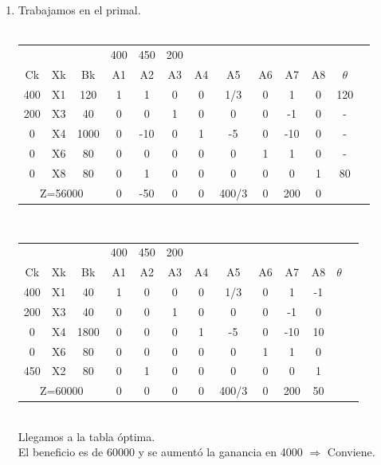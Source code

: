 \documentclass{article}
\begin{document}
\begin{enumerate}
		\newpage
	\item Trabajamos en el primal.\\
     	\smallskip\\
		\begin{tabular}{|c  c  c | c  c  c  c  c  c  c  c  c | c |}
			\hline
			 \multicolumn{3}{|c|}{} & 400 & 450 & 200 & & & & & & \\ 
			 Ck & Xk & Bk & A1 & A2 & A3 & A4 & A5 & A6 & A7 & A8 & $\theta$\\ \hline 
			 400 & X1 & 120 & 1 & 1 & 0 & 0 & 1/3 & 0 & 1 & 0 & 120\\
			 200 & X3 & 40 & 0 & 0 & 1 & 0 & 0 & 0  & -1 & 0 & -\\
			 0 & X4 & 1000 & 0 & -10 & 0 & 1 & -5 & 0 & -10 & 0 & -\\ 
			 0 & X6 & 80   & 0 & 0   & 0 & 0 & 0  & 1 & 1   & 0 & -\\
			 0 & X8 & 80   & 0 & 1   & 0 & 0 & 0  & 0 & 0   & 1 & 80\\ \hline
			 \multicolumn{3}{|c|}{Z=56000} & 0 & -50 & 0 & 0 & 400/3 & 0 & 200 & 0 &\\ \hline
		\end{tabular}
     	\smallskip\\
		\begin{tabular}{|c  c  c | c  c  c  c  c  c  c  c  c | c |}
			\hline
			 \multicolumn{3}{|c|}{} & 400 & 450 & 200 & & & & & & \\ 
			 Ck  & Xk & Bk   & A1 & A2 & A3 & A4 & A5 & A6 & A7 & A8 & $\theta$\\ \hline 
			 400 & X1 & 40  & 1  & 0   & 0 & 0 & 1/3 & 0  & 1   & -1    & \\
			 200 & X3 & 40   & 0  & 0   & 1 & 0 & 0   & 0  & -1  & 0     & \\
			 0   & X4 & 1800 & 0  & 0   & 0 & 1 & -5  & 0  & -10 & 10    & \\ 
			 0   & X6 & 80   & 0  & 0   & 0 & 0 & 0   & 1  & 1   & 0     & \\
			 450   & X2 & 80   & 0  & 1   & 0 & 0 & 0   & 0  & 0   & 1     & \\ \hline
			 \multicolumn{3}{|c|}{Z=60000} & 0 & 0  & 0  & 0   & 400/3 & 0 & 200 & 50 &\\ \hline
		\end{tabular}
     	\smallskip\\
     	
		Llegamos a la tabla \'optima.\\
		El beneficio es de 60000 y se aument\'o la ganancia en 4000 $\Rightarrow$   Conviene.\\
     	
\end{enumerate}
\end{document}
